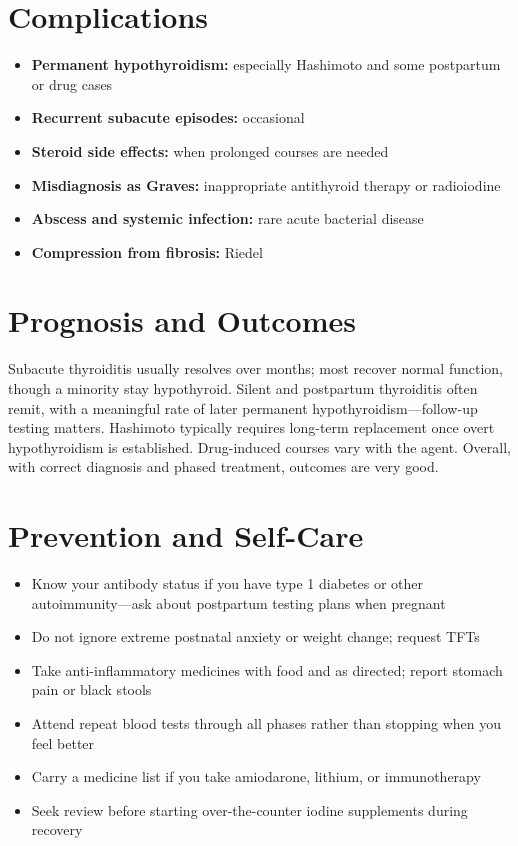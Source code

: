 \section*{Complications}
\begin{itemize}
    \item \textbf{Permanent hypothyroidism:} especially Hashimoto and some postpartum or drug cases
    \item \textbf{Recurrent subacute episodes:} occasional
    \item \textbf{Steroid side effects:} when prolonged courses are needed
    \item \textbf{Misdiagnosis as Graves:} inappropriate antithyroid therapy or radioiodine
    \item \textbf{Abscess and systemic infection:} rare acute bacterial disease
    \item \textbf{Compression from fibrosis:} Riedel
\end{itemize}

\section*{Prognosis and Outcomes}
Subacute thyroiditis usually resolves over months; most recover normal function, though a minority stay hypothyroid. Silent and postpartum thyroiditis often remit, with a meaningful rate of later permanent hypothyroidism---follow-up testing matters. Hashimoto typically requires long-term replacement once overt hypothyroidism is established. Drug-induced courses vary with the agent. Overall, with correct diagnosis and phased treatment, outcomes are very good.

\section*{Prevention and Self-Care}
\begin{itemize}
    \item Know your antibody status if you have type 1 diabetes or other autoimmunity---ask about postpartum testing plans when pregnant
    \item Do not ignore extreme postnatal anxiety or weight change; request TFTs
    \item Take anti-inflammatory medicines with food and as directed; report stomach pain or black stools
    \item Attend repeat blood tests through all phases rather than stopping when you feel better
    \item Carry a medicine list if you take amiodarone, lithium, or immunotherapy
    \item Seek review before starting over-the-counter iodine supplements during recovery
\end{itemize}

